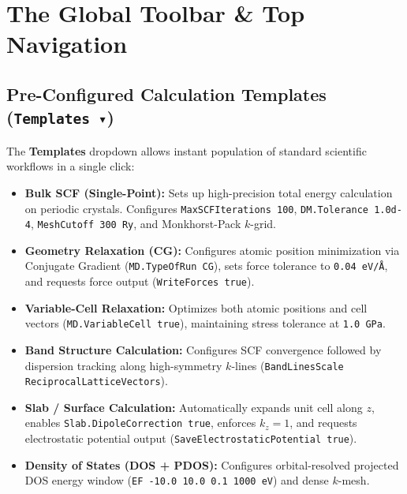 \documentclass[11pt,a4paper]{article}
\begin{document}
\newpage
\section{The Global Toolbar \& Top Navigation}

\subsection{Pre-Configured Calculation Templates (\texttt{Templates ▾})}
The \textbf{Templates} dropdown allows instant population of standard scientific workflows in a single click:
\begin{itemize}[leftmargin=*]
 \item \textbf{Bulk SCF (Single-Point):} Sets up high-precision total energy calculation on periodic crystals. Configures \texttt{MaxSCFIterations 100}, \texttt{DM.Tolerance 1.0d-4}, \texttt{MeshCutoff 300 Ry}, and Monkhorst-Pack $k$-grid.
 \item \textbf{Geometry Relaxation (CG):} Configures atomic position minimization via Conjugate Gradient (\texttt{MD.TypeOfRun CG}), sets force tolerance to \texttt{0.04 eV/\AA}, and requests force output (\texttt{WriteForces true}).
 \item \textbf{Variable-Cell Relaxation:} Optimizes both atomic positions and cell vectors (\texttt{MD.VariableCell true}), maintaining stress tolerance at \texttt{1.0 GPa}.
 \item \textbf{Band Structure Calculation:} Configures SCF convergence followed by dispersion tracking along high-symmetry $k$-lines (\texttt{BandLinesScale ReciprocalLatticeVectors}).
 \item \textbf{Slab / Surface Calculation:} Automatically expands unit cell along $z$, enables \texttt{Slab.DipoleCorrection true}, enforces $k_z = 1$, and requests electrostatic potential output (\texttt{SaveElectrostaticPotential true}).
 \item \textbf{Density of States (DOS + PDOS):} Configures orbital-resolved projected DOS energy window (\texttt{EF -10.0 10.0 0.1 1000 eV}) and dense $k$-mesh.
\end{itemize}
\end{document}
